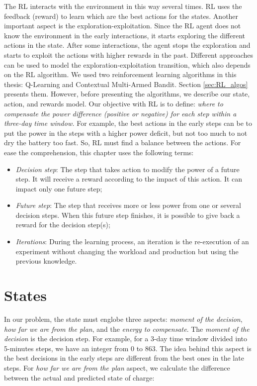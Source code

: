 The RL interacts with the environment in this way several times. RL uses the feedback (reward) to learn which are the best actions for the states. Another important aspect is the exploration-exploitation. Since the RL agent does not know the environment in the early interactions, it starts exploring the different actions in the state. After some interactions, the agent stops the exploration and starts to exploit the actions with higher rewards in the past. Different approaches can be used to model the exploration-exploitation transition, which also depends on the RL algorithm. We used two reinforcement learning algorithms in this thesis: Q-Learning and Contextual Multi-Armed Bandit. Section \ref{sec:RL_algos} presents them. However, before presenting the algorithms, we describe our state, action, and rewards model. Our objective with RL is to define: \textit{where to compensate the power difference (positive or negative) for each step within a three-day time window.} For example, the best actions in the early steps can be to put the power in the steps with a higher power deficit, but not too much to not dry the battery too fast. So, RL must find a balance between the actions. For ease the comprehension, this chapter uses the following terms:
\begin{itemize}
    \item \textit{Decision step}: The step that takes action to modify the power of a future step. It will receive a reward according to the impact of this action. It can impact only one future step;
    \item \textit{Future step}: The step that receives more or less power from one or several decision steps. When this future step finishes, it is possible to give back a reward for the decision step(s);
    \item \textit{Iterations}: During the learning process, an iteration is the re-execution of an experiment without changing the workload and production but using the previous knowledge.
\end{itemize}

\section{States}

In our problem, the state must englobe three aspects: \textit{moment of the decision}, \textit{how far we are from the plan}, and the \textit{energy to compensate}. The \textit{moment of the decision} is the decision step. For example, for a 3-day time window divided into 5-minutes steps, we have an integer from 0 to 863. The idea behind this aspect is the best decisions in the early steps are different from the best ones in the late steps. For \textit{how far we are from the plan} aspect, we calculate the difference between the actual and predicted state of charge:

